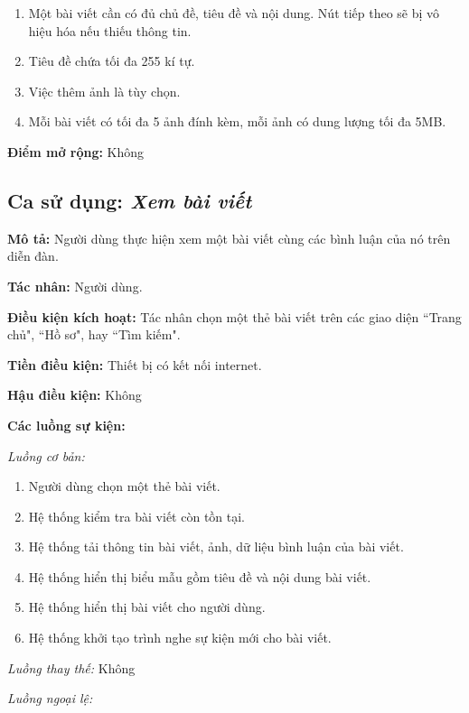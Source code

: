 \documentclass[../main.tex]{subfiles}
\begin{document}
\begin{enumerate}[label=BR\arabic{*}.]
  \item Một bài viết cần có đủ chủ đề, tiêu đề và nội dung. Nút tiếp theo sẽ bị vô hiệu hóa nếu thiếu thông tin.
  \item Tiêu đề chứa tối đa 255 kí tự.
  \item Việc thêm ảnh là tùy chọn.
  \item Mỗi bài viết có tối đa 5 ảnh đính kèm, mỗi ảnh có dung lượng tối đa 5MB.
\end{enumerate}

\noindent
\textbf{Điểm mở rộng:} Không

\subsection{Ca sử dụng: \textit{Xem bài viết}}

\noindent
\textbf{Mô tả:} Người dùng thực hiện xem một bài viết cùng các bình luận của nó trên diễn đàn.

\noindent
\textbf{Tác nhân:} Người dùng.

\noindent
\textbf{Điều kiện kích hoạt:} Tác nhân chọn một thẻ bài viết trên các giao diện ``Trang chủ", ``Hồ sơ", hay ``Tìm kiếm".

\noindent
\textbf{Tiền điều kiện:} Thiết bị có kết nối internet.

\noindent
\textbf{Hậu điều kiện:} Không

\noindent
\textbf{Các luồng sự kiện:}

\noindent
\textit{Luồng cơ bản:}

\begin{enumerate}[label=B\arabic{*}.]
    \item Người dùng chọn một thẻ bài viết.
    \item Hệ thống kiểm tra bài viết còn tồn tại.
    \item Hệ thống tải thông tin bài viết, ảnh, dữ liệu bình luận của bài viết.
    \item Hệ thống hiển thị biểu mẫu gồm tiêu đề và nội dung bài viết. 
    \item Hệ thống hiển thị bài viết cho người dùng.
    \item Hệ thống khởi tạo trình nghe sự kiện mới cho bài viết.
\end{enumerate}

\noindent
\textit{Luồng thay thế:} Không

\noindent
\textit{Luồng ngoại lệ:}
\end{document}
